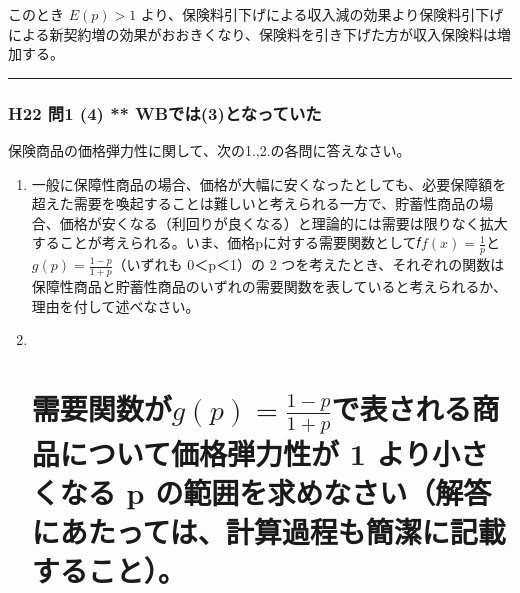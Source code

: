\documentclass[]{article}
\begin{document}
このとき \(E(p) > 1\)
より、保険料引下げによる収入減の効果より保険料引下げによる新契約増の効果がおおきくなり、保険料を引き下げた方が収入保険料は増加する。

\begin{center}\rule{0.5\linewidth}{0.5pt}\end{center}

\hypertarget{h22-ux554f1-4-wbux3067ux306f3ux3068ux306aux3063ux3066ux3044ux305f}{%
\subsubsection{H22 問1 (4) **
WBでは(3)となっていた}\label{h22-ux554f1-4-wbux3067ux306f3ux3068ux306aux3063ux3066ux3044ux305f}}

保険商品の価格弾力性に関して、次の1.,2.の各問に答えなさい。

\begin{enumerate}
\def\labelenumi{\arabic{enumi}.}
\item
  一般に保障性商品の場合、価格が大幅に安くなったとしても、必要保障額を超えた需要を喚起することは難しいと考えられる一方で、貯蓄性商品の場合、価格が安くなる（利回りが良くなる）と理論的には需要は限りなく拡大することが考えられる。いま、価格pに対する需要関数として𝑓\(f(x)=\frac{1}{p}\)と\(g(p)=\frac{1-p}{1+p}\)（いずれも
  0＜p＜1）の 2
  つを考えたとき、それぞれの関数は保障性商品と貯蓄性商品のいずれの需要関数を表していると考えられるか、理由を付して述べなさい。
\item ~
  \hypertarget{ux9700ux8981ux95a2ux6570ux304cgpfrac1-p1pux3067ux8868ux3055ux308cux308bux5546ux54c1ux306bux3064ux3044ux3066ux4fa1ux683cux5f3eux529bux6027ux304c-1-ux3088ux308aux5c0fux3055ux304fux306aux308b-p-ux306eux7bc4ux56f2ux3092ux6c42ux3081ux306aux3055ux3044ux89e3ux7b54ux306bux3042ux305fux3063ux3066ux306fux8a08ux7b97ux904eux7a0bux3082ux7c21ux6f54ux306bux8a18ux8f09ux3059ux308bux3053ux3068}{%
  \section{\texorpdfstring{需要関数が\(g(p)=\frac{1-p}{1+p}\)で表される商品について価格弾力性が
  1 より小さくなる p
  の範囲を求めなさい（解答にあたっては、計算過程も簡潔に記載すること）。}{需要関数がg(p)=\textbackslash frac\{1-p\}\{1+p\}で表される商品について価格弾力性が 1 より小さくなる p の範囲を求めなさい（解答にあたっては、計算過程も簡潔に記載すること）。}}\label{ux9700ux8981ux95a2ux6570ux304cgpfrac1-p1pux3067ux8868ux3055ux308cux308bux5546ux54c1ux306bux3064ux3044ux3066ux4fa1ux683cux5f3eux529bux6027ux304c-1-ux3088ux308aux5c0fux3055ux304fux306aux308b-p-ux306eux7bc4ux56f2ux3092ux6c42ux3081ux306aux3055ux3044ux89e3ux7b54ux306bux3042ux305fux3063ux3066ux306fux8a08ux7b97ux904eux7a0bux3082ux7c21ux6f54ux306bux8a18ux8f09ux3059ux308bux3053ux3068}}
\end{enumerate}
\end{document}

